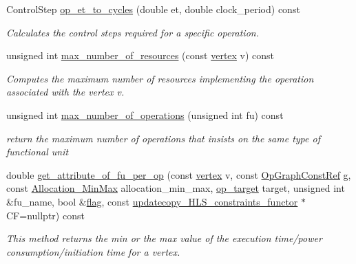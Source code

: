 \begin{DoxyCompactItemize}
\item 
Control\+Step \hyperlink{classAllocationInformation_a801fe716fe2feb8fa5dccbf0a5dc4259}{op\+\_\+et\+\_\+to\+\_\+cycles} (double et, double clock\+\_\+period) const
\begin{DoxyCompactList}\small\item\em Calculates the control steps required for a specific operation. \end{DoxyCompactList}\item 
unsigned int \hyperlink{classAllocationInformation_a2e8890d648962f9ae7138611f05edb28}{max\+\_\+number\+\_\+of\+\_\+resources} (const \hyperlink{graph_8hpp_abefdcf0544e601805af44eca032cca14}{vertex} v) const
\begin{DoxyCompactList}\small\item\em Computes the maximum number of resources implementing the operation associated with the vertex v. \end{DoxyCompactList}\item 
unsigned int \hyperlink{classAllocationInformation_a5e95ad970c76cfd32541915146d79002}{max\+\_\+number\+\_\+of\+\_\+operations} (unsigned int fu) const
\begin{DoxyCompactList}\small\item\em return the maximum number of operations that insists on the same type of functional unit \end{DoxyCompactList}\item 
double \hyperlink{classAllocationInformation_ae46c25c700c15eb6ba2505f6527ca6f1}{get\+\_\+attribute\+\_\+of\+\_\+fu\+\_\+per\+\_\+op} (const \hyperlink{graph_8hpp_abefdcf0544e601805af44eca032cca14}{vertex} v, const \hyperlink{op__graph_8hpp_a9a0b240622c47584bee6951a6f5de746}{Op\+Graph\+Const\+Ref} g, const \hyperlink{allocation_8hpp_ac615dfccdc03f10d085f4fd1c4c7912b}{Allocation\+\_\+\+Min\+Max} allocation\+\_\+min\+\_\+max, \hyperlink{classAllocationInformation_aab74a04623ed2f1fb1708c8007a1736c}{op\+\_\+target} target, unsigned int \&fu\+\_\+name, bool \&\hyperlink{tutorial__fpl__2017_2lab2_2materials_22_86_2SPARC-GCC_8h_a28a1ef2372a94a558be91f61912bc371}{flag}, const \hyperlink{structupdatecopy__HLS__constraints__functor}{updatecopy\+\_\+\+H\+L\+S\+\_\+constraints\+\_\+functor} $\ast$CF=nullptr) const
\begin{DoxyCompactList}\small\item\em This method returns the min or the max value of the execution time/power consumption/initiation time for a vertex. \end{DoxyCompactList}\item 

\end{DoxyCompactItemize}
